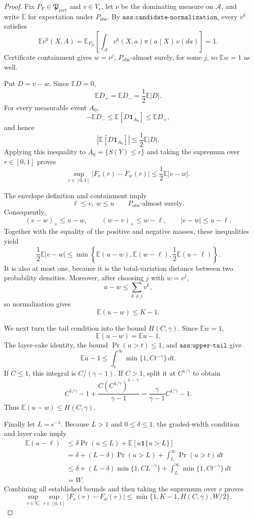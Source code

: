 \documentclass{article}
\begin{document}
\begin{proof}
Fix \(P_F\in\mathfrak P_{\mathrm{cert}}\) and \(v\in V_\epsilon\), let \(\nu\) be the dominating measure on \(\mathcal A\), and write \(\mathbb E\) for expectation under \(P_{\mathrm{obs}}\). By \(\texttt{ass:candidate-normalization}\), every \(v^k\) satisfies
\[
\mathbb E v^k(X,A)
 =\mathbb E_{P_X}\!\left[
   \int_{\mathcal A}v^k(X,a)\pi(a\mid X)\,\nu(da)
 \right]=1.
\]
Certificate containment gives \(w=v^j\), \(P_{\mathrm{obs}}\)-almost surely, for some \(j\), so \(\mathbb Ew=1\) as well.

Put \(D=v-w\). Since \(\mathbb ED=0\),
\[
\mathbb ED_+=\mathbb ED_-=\frac12\mathbb E|D|.
\]
For every measurable event \(A_0\),
\[
-\mathbb ED_-\le \mathbb E[D\mathbf 1_{A_0}]\le\mathbb ED_+,
\]
and hence
\[
\left|\mathbb E[D\mathbf 1_{A_0}]\right|
 \le\frac12\mathbb E|D|.
\]
Applying this inequality to \(A_0=\{S(Y)\le r\}\) and taking the supremum over \(r\in[0,1]\) proves
\[
\sup_{r\in[0,1]}|F_v(r)-F_w(r)|
 \le\frac12\mathbb E|v-w|.
\]

The envelope definition and containment imply
\[
\ell\le v,\ w\le u
\qquad P_{\mathrm{obs}}\text{-almost surely}.
\]
Consequently,
\[
(v-w)_+\le u-w,\qquad
(w-v)_+\le w-\ell,\qquad
|v-w|\le u-\ell.
\]
Together with the equality of the positive and negative masses, these inequalities yield
\[
\frac12\mathbb E|v-w|
 \le\min\!\left\{
 \mathbb E(u-w),\mathbb E(w-\ell),
 \frac12\mathbb E(u-\ell)\right\}.
\]
It is also at most one, because it is the total-variation distance between two probability densities. Moreover, after choosing \(j\) with \(w=v^j\),
\[
u-w\le\sum_{k\ne j}v^k,
\]
so normalization gives
\[
\mathbb E(u-w)\le K-1.
\]

We next turn the tail condition into the bound \(H(C,\gamma)\). Since \(\mathbb Ew=1\),
\[
\mathbb E(u-w)=\mathbb Eu-1.
\]
The layer-cake identity, the bound \(\Pr(u>t)\le1\), and \(\texttt{ass:upper-tail}\) give
\[
\mathbb Eu-1
 \le\int_1^\infty\min\{1,Ct^{-\gamma}\}\,dt.
\]
If \(C\le1\), this integral is \(C/(\gamma-1)\). If \(C>1\), split it at \(C^{1/\gamma}\) to obtain
\[
C^{1/\gamma}-1+
 \frac{C(C^{1/\gamma})^{1-\gamma}}{\gamma-1}
 =\frac{\gamma}{\gamma-1}C^{1/\gamma}-1.
\]
Thus \(\mathbb E(u-w)\le H(C,\gamma)\).

Finally let \(L=\epsilon^{-1}\). Because \(L>1\) and \(0\le\delta\le1\), the graded-width condition and layer cake imply
\[
\begin{aligned}
\mathbb E(u-\ell)
&\le\delta\Pr(u\le L)+\mathbb E[u\mathbf 1\{u>L\}]\\
&=\delta+(L-\delta)\Pr(u>L)
  +\int_L^\infty\Pr(u>t)\,dt\\
&\le\delta+(L-\delta)\min\{1,CL^{-\gamma}\}
  +\int_L^\infty\min\{1,Ct^{-\gamma}\}\,dt\\
&=W.
\end{aligned}
\]
Combining all established bounds and then taking the supremum over \(v\) proves
\[
\sup_{v\in V_\epsilon}\sup_{r\in[0,1]}
 |F_v(r)-F_w(r)|
 \le\min\{1,K-1,H(C,\gamma),W/2\}.
\]


\end{proof}
\end{document}
